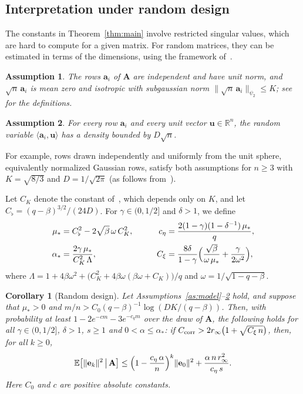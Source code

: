 \documentclass[pdflatex,sn-mathphys-num]{sn-jnl}
\theoremstyle{thmstyleone}
\newtheorem{assumption}{Assumption}
\newtheorem{corollary}{Corollary}
\theoremstyle{thmstylethree}
\newcommand{\mA}{\mathbf{A}}
\newcommand{\va}{\mathbf{a}}
\newcommand{\ve}{\mathbf{e}}
\begin{document}
\subsection{Interpretation under random design}
\label{subsec:random_design}
The constants in Theorem~\ref{thm:main} involve restricted singular values,
which are hard to compute for a given matrix. For random matrices, they can be
estimated in terms of the dimensions, using the framework
of~\cite{haddock2022quantilebased}.

\begin{assumption}
\label{as:subgaus}
The rows $\va_i$ of $\mA$ are independent and have unit norm, and
$\sqrt n\,\va_i$ is mean zero and isotropic with subgaussian norm
$\|\sqrt n\,\va_i\|_{\psi_2}\le K$; see~\cite[Sections~2.5
and~3.4]{vershynin2018high} for the definitions.
\end{assumption}

\begin{assumption}
\label{as:density}
For every row $\va_i$ and every unit vector $\mathbf u\in\mathbb R^n$, the
random variable $\langle\va_i,\mathbf u\rangle$ has a density bounded by
$D\sqrt n$.
\end{assumption}

For example, rows drawn independently and uniformly from the unit sphere,
equivalently normalized Gaussian rows, satisfy both assumptions for $n\ge3$
with $K=\sqrt{8/3}$ and $D=1/\sqrt{2\pi}$ (as follows from~\cite[Section~2.5]{vershynin2018high}).

Let $C_K$ denote the constant of~\cite[Theorem~3.1]{haddock2022quantilebased},
which depends only on $K$, and let $C_\flat=(q-\beta)^{3/2}/(24D)$. For
$\gamma\in(0,1/2]$ and $\delta>1$, we define
\[
\begin{aligned}
\mu_*&=C_\flat^2-2\sqrt\beta\,\omega\,C_K^2,
&\qquad
c_\eta&=\frac{2(1-\gamma)(1-\delta^{-1})\,\mu_*}{q},\\
\alpha_*&=\frac{2\gamma\,\mu_*}{C_K^2\,\Lambda},
&\qquad
C_\xi&=\frac{8\delta}{1-\gamma}\Bigl(\frac{\sqrt\beta}{\omega\,\mu_*}
+\frac{\gamma}{2\omega^2}\Bigr),
\end{aligned}
\]
where $\Lambda=1+4\beta\omega^2+\bigl(C_K^2+4\beta\omega(\beta\omega+C_K)\bigr)/q$ and $\omega=1/\sqrt{1-q-\beta}$.

\begin{corollary}[Random design]
\label{cor:random_design}
Let Assumptions~\ref{as:model}--\ref{as:density} hold, and
suppose that $\mu_*>0$ and $m/n>C_0(q-\beta)^{-1}\log(DK/(q-\beta))$. Then,
with probability at least $1-2e^{-cm}-3e^{-c_qm}$ over the draw of $\mA$, the
following holds for all $\gamma\in(0,1/2]$, $\delta>1$, $s\ge1$ and
$0<\alpha\le\alpha_*$: if $C_{\rm corr}>2r_\infty\bigl(1+\sqrt{C_\xi\,n}\bigr)$,
then, for all $k\ge0$,
\[
\mathbb E\bigl[\|\ve_k\|^2\,\big|\,\mA\bigr]
\le\Bigl(1-\frac{c_\eta\,\alpha}{n}\Bigr)^k\|\ve_0\|^2
+\frac{\alpha\,n\,r_\infty^2}{c_\eta\,s}.
\]
Here $C_0$ and $c$ are positive absolute constants.
\end{corollary}
\end{document}
